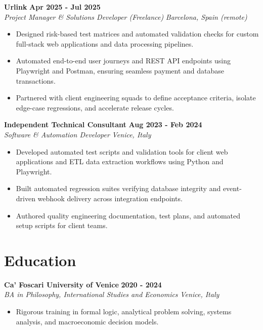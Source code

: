 \documentclass[10pt,a4paper]{article}
\newcommand{\role}[4]{%
  \textbf{#1} \hfill \textbf{#2}\\[1pt]%
  \textit{#3} \hfill \textit{#4}\\[2pt]%
}
\begin{document}
\role{Urlink}{Apr 2025 - Jul 2025}{Project Manager \& Solutions Developer (Freelance)}{Barcelona, Spain (remote)}
\begin{itemize}
  \item Designed risk-based test matrices and automated validation checks for custom full-stack web applications and data processing pipelines.
  \item Automated end-to-end user journeys and REST API endpoints using Playwright and Postman, ensuring seamless payment and database transactions.
  \item Partnered with client engineering squads to define acceptance criteria, isolate edge-case regressions, and accelerate release cycles.
\end{itemize}

\role{Independent Technical Consultant}{Aug 2023 - Feb 2024}{Software \& Automation Developer}{Venice, Italy}
\begin{itemize}
  \item Developed automated test scripts and validation tools for client web applications and ETL data extraction workflows using Python and Playwright.
  \item Built automated regression suites verifying database integrity and event-driven webhook delivery across integration endpoints.
  \item Authored quality engineering documentation, test plans, and automated setup scripts for client teams.
\end{itemize}

\section{Education}
\role{Ca' Foscari University of Venice}{2020 - 2024}{BA in Philosophy, International Studies and Economics}{Venice, Italy}
\begin{itemize}
  \item Rigorous training in formal logic, analytical problem solving, systems analysis, and macroeconomic decision models.
\end{itemize}
\end{document}
